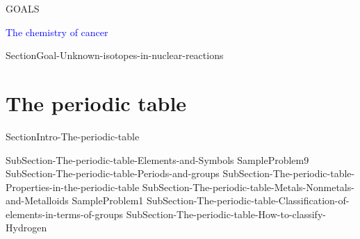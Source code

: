 \documentclass[main.tex]{subfiles}
\newcommand\chapterlabel{ChMIX-biomoleculesinsolution}\setcounter{figurenewcounter}{0}\setcounter{tablenewcounter}{0}\setcounter{formulanewcounter}{0}
\begin{document}
\begin{marginfigure}
\begin{mytcbox}{GOALS}
\renewcommand\chapterlabel{Ch-nuclear}
\begin{center}\textcolor{blue}{\faFlash The chemistry of cancer} \end{center}
\begin{enumerate}[label=\protect\circled{\color{white}\arabic*}]
{SectionGoal-Unknown-isotopes-in-nuclear-reactions}
\end{enumerate}
	
%			 				 




\end{mytcbox}
\vspace{1cm}
\end{marginfigure}%






\renewcommand\chapterlabel{Ch-Table}
\section{\faEnvira The periodic table}{SectionIntro-The-periodic-table}
\sloppy\begin{description}
{SubSection-The-periodic-table-Elements-and-Symbols}
{SampleProblem9}
{SubSection-The-periodic-table-Periods-and-groups}
{SubSection-The-periodic-table-Properties-in-the-periodic-table}
{SubSection-The-periodic-table-Metals-Nonmetals-and-Metalloids}
{SampleProblem1}
{SubSection-The-periodic-table-Classification-of-elements-in-terms-of-groups}
{SubSection-The-periodic-table-How-to-classify-Hydrogen}
 \hspace{0cm}{Figure-The-periodic-table}
 \end{description}
 
\end{document}
